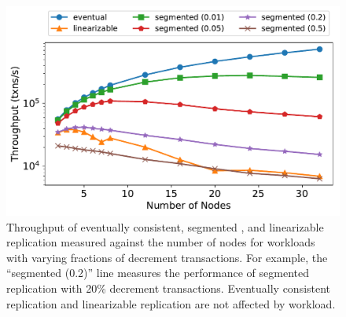 %

\begin{figure}[t]
  \centering
  \includegraphics[width=\columnwidth]{figures/throughput_vs_num_nodes_multi.pdf}
  \caption{%
    Throughput of eventually consistent, segmented \invariantconfluent{}, and
    linearizable replication measured against the number of nodes for workloads
    with varying fractions of decrement transactions. For example, the
    ``segmented (0.2)'' line measures the performance of segmented
    \invariantconfluent{} replication with 20\% decrement transactions.
    Eventually consistent replication and linearizable replication are not
    affected by workload.
  }
\end{figure}

